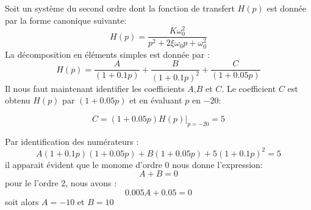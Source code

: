 Soit un système du second ordre dont la fonction de transfert $H(p)$ est donnée
par la forme canonique suivante:
\[
H(p)=\dfrac{K\omega_0^2}{p^2+2\xi\omega_0p+\omega_0^2}
\]
La décomposition en éléments simples est donnée par :
\[
H(p)=\dfrac{A}{(1+0.1p)}+\dfrac{B}{(1+0.1p)^2}+\dfrac{C}{(1+0.05p)}
\]
Il nous faut maintenant identifier les coefficients $A$,$B$ et $C$.
Le coefficient $C$ est obtenu $H(p)$ par $(1+0.05p)$ et en évaluant $p$ en 
$-20$:

\[
C=(1+0.05p)H(p)\Big|_{p=-20}=5
\]

Par identification des numérateurs :
\[
A(1+0.1p)(1+0.05p)+B(1+0.05p)+5(1+0.1p)^2=5
\]
il apparait évident que le monome d'ordre 0 nous donne l'expression:
\[
A+B=0
\]
pour le l'ordre 2, nous avons :
\[
0.005A+0.05=0
\]
soit alors $A=-10$ et $B=10$

